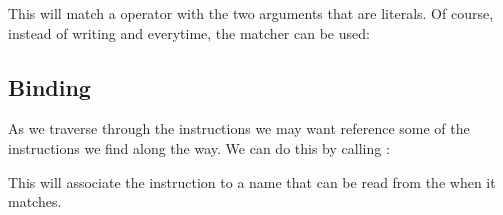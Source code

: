 \documentclass[letterpaper,10pt,english]{sphinxmanual}
\begin{document}
\sphinxAtStartPar
This will match a  operator with the two arguments that are literals. Of course, instead of writing  and  everytime, the  matcher can be used:

\begin{sphinxVerbatim}[commandchars=\\\{\}]
\end{sphinxVerbatim}


\subsection{Binding}
\label{\detokenize{dev/matchers:binding}}
\sphinxAtStartPar
As we traverse through the instructions we may want reference some of the instructions we find along the way. We can do this by calling :

\begin{sphinxVerbatim}[commandchars=\\\{\}]
\end{sphinxVerbatim}

\sphinxAtStartPar
This will associate the instruction to a name that can be read from the  when it matches.
\end{document}
